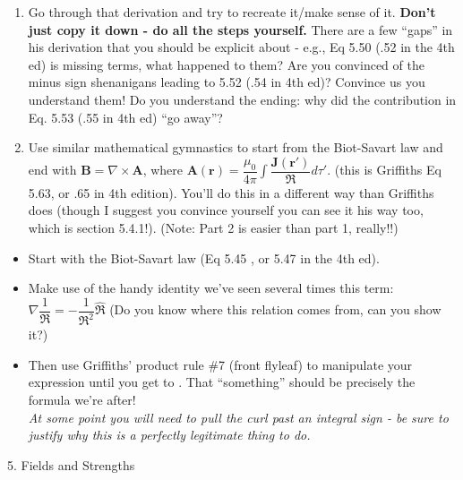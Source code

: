 \documentclass[11pt]{article}
\def\tightlist{}
\begin{document}
\begin{enumerate}
\def\labelenumi{\arabic{enumi}.}
\item
  Go through that derivation and try to recreate it/make sense of it.
  \textbf{Don't just copy it down - do all the steps yourself.} There
  are a few ``gaps'' in his derivation that you should be explicit about
  - e.g., Eq 5.50 (.52 in the 4th ed) is missing terms, what happened to
  them? Are you convinced of the minus sign shenanigans leading to 5.52
  (.54 in 4th ed)? Convince us you understand them! Do you understand
  the ending: why did the contribution in Eq. 5.53 (.55 in 4th ed) ``go
  away''?
\item
  Use similar mathematical gymnastics to start from the Biot-Savart law
  and end with \(\mathbf{B} = \nabla \times \mathbf{A}\), where
  \(\mathbf{A}(\mathbf{r}) = \dfrac{\mu_0}{4 \pi} \int \dfrac{\mathbf{J}(\mathbf{r}')}{\mathfrak{R}}d\tau'\).
  (this is Griffiths Eq 5.63, or .65 in 4th edition). You'll do this in
  a different way than Griffiths does (though I suggest you convince
  yourself you can see it his way too, which is section 5.4.1!). (Note:
  Part 2 is easier than part 1, really!!)
\end{enumerate}

\begin{itemize}
\tightlist
\item
  Start with the Biot-Savart law (Eq 5.45 , or 5.47 in the 4th ed).
\item
  Make use of the handy identity we've seen several times this term:
  \(\nabla \dfrac{1}{\mathfrak{R}} = -\dfrac{1}{\mathfrak{R}^2}\hat{\mathfrak{R}}\)
  (Do you know where this relation comes from, can you show it?)\\
\item
  Then use Griffiths' product rule \#7 (front flyleaf) to manipulate
  your expression until you get to . That ``something'' should be
  precisely the formula we're after!\\
  \emph{At some point you will need to pull the curl past an integral
  sign - be sure to justify why this is a perfectly legitimate thing to
  do.}
\end{itemize}

{\Large 5. Fields and Strengths}\label{fields-and-strengths}
\end{document}
